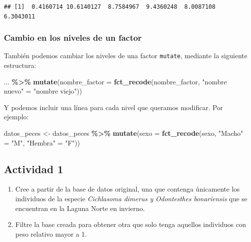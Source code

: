 \documentclass[
]{article}
\newenvironment{Shaded}{\begin{snugshade}}{\end{snugshade}}
\newcommand{\AttributeTok}[1]{\textcolor[rgb]{0.13,0.29,0.53}{#1}}
\newcommand{\FunctionTok}[1]{\textcolor[rgb]{0.13,0.29,0.53}{\textbf{#1}}}
\newcommand{\NormalTok}[1]{#1}
\newcommand{\OtherTok}[1]{\textcolor[rgb]{0.56,0.35,0.01}{#1}}
\newcommand{\SpecialCharTok}[1]{\textcolor[rgb]{0.81,0.36,0.00}{\textbf{#1}}}
\newcommand{\StringTok}[1]{\textcolor[rgb]{0.31,0.60,0.02}{#1}}
\providecommand{\tightlist}{%
  \setlength{\itemsep}{0pt}\setlength{\parskip}{0pt}}
\begin{document}
\begin{verbatim}
## [1]  0.4160714 10.6140127  8.7584967  9.4360248  8.0087108  6.3043011
\end{verbatim}

\subsubsection{Cambio en los niveles de un
factor}\label{cambio-en-los-niveles-de-un-factor}

También podemos cambiar los niveles de una factor \texttt{mutate},
mediante la siguiente estructura:

\begin{Shaded}
\begin{Highlighting}[]
\NormalTok{... }\SpecialCharTok{\%\textgreater{}\%}
  \FunctionTok{mutate}\NormalTok{(}\AttributeTok{nombre\_factor =} \FunctionTok{fct\_recode}\NormalTok{(nombre\_factor,}
                        \StringTok{"nombre nuevo"} \OtherTok{=} \StringTok{"nombre viejo"}\NormalTok{))}
\end{Highlighting}
\end{Shaded}

Y podemos incluir una línea para cada nivel que queramos modificar. Por
ejemplo:

\begin{Shaded}
\begin{Highlighting}[]
\NormalTok{datos\_peces }\OtherTok{\textless{}{-}}\NormalTok{ datos\_peces }\SpecialCharTok{\%\textgreater{}\%} 
  \FunctionTok{mutate}\NormalTok{(}\AttributeTok{sexo =} \FunctionTok{fct\_recode}\NormalTok{(sexo,}
                           \StringTok{"Macho"} \OtherTok{=} \StringTok{"M"}\NormalTok{,}
                           \StringTok{"Hembra"} \OtherTok{=} \StringTok{"F"}\NormalTok{))}
\end{Highlighting}
\end{Shaded}

\subsection{Actividad 1}\label{actividad-1}

\begin{enumerate}
\def\labelenumi{\arabic{enumi}.}
\tightlist
\item
  Cree a partir de la base de datos original, una que contenga
  únicamente los individuos de la especie \emph{Cichlasoma dimerus y
  Odontesthes bonariensis} que se encuentran en la Laguna Norte en
  invierno.
\item
  Filtre la base creada para obtener otra que solo tenga aquellos
  individuos con peso relativo mayor a 1.
\end{enumerate}
\end{document}

